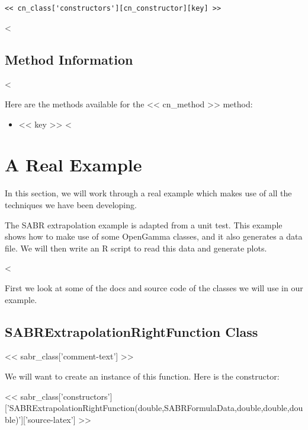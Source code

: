\begin{Verbatim}
<< cn_class['constructors'][cn_constructor][key] >>
\end{Verbatim}

<%

\subsection{Method Information}

<%

Here are the methods available for the << cn_method >> method:

\begin{itemize}
<%
\item{<< key >>}
<%
\end{itemize}

\section{A Real Example}

In this section, we will work through a real example which makes use of all the
techniques we have been developing.

The SABR extrapolation example is adapted from a unit test. This example shows
how to make use of some OpenGamma classes, and it also generates a data file.
We will then write an R script to read this data and generate plots.

<%

First we look at some of the docs and source code of the classes we will use in
our example.

\subsection{SABRExtrapolationRightFunction Class}

<< sabr_class['comment-text'] >>

We will want to create an instance of this function. Here is the constructor:

<< sabr_class['constructors']['SABRExtrapolationRightFunction(double,SABRFormulaData,double,double,double)']['source-latex'] >>

